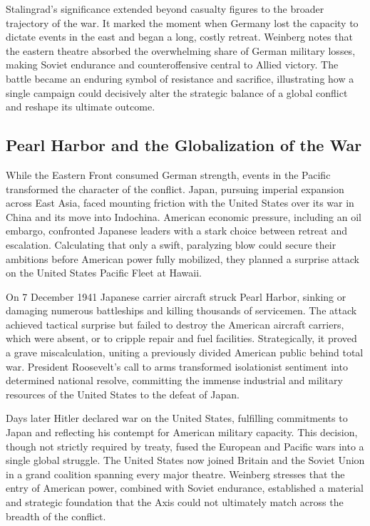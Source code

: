 Stalingrad's significance extended beyond casualty figures to the broader trajectory of the war. It marked the moment when Germany lost the capacity to dictate events in the east and began a long, costly retreat. Weinberg notes that the eastern theatre absorbed the overwhelming share of German military losses, making Soviet endurance and counteroffensive central to Allied victory. The battle became an enduring symbol of resistance and sacrifice, illustrating how a single campaign could decisively alter the strategic balance of a global conflict and reshape its ultimate outcome. \cite{beevor2012} \cite{weinberg1994} \cite{hastings2011}

\subsection{Pearl Harbor and the Globalization of the War}
While the Eastern Front consumed German strength, events in the Pacific transformed the character of the conflict. Japan, pursuing imperial expansion across East Asia, faced mounting friction with the United States over its war in China and its move into Indochina. American economic pressure, including an oil embargo, confronted Japanese leaders with a stark choice between retreat and escalation. Calculating that only a swift, paralyzing blow could secure their ambitions before American power fully mobilized, they planned a surprise attack on the United States Pacific Fleet at Hawaii.

On 7 December 1941 Japanese carrier aircraft struck Pearl Harbor, sinking or damaging numerous battleships and killing thousands of servicemen. The attack achieved tactical surprise but failed to destroy the American aircraft carriers, which were absent, or to cripple repair and fuel facilities. Strategically, it proved a grave miscalculation, uniting a previously divided American public behind total war. President Roosevelt's call to arms transformed isolationist sentiment into determined national resolve, committing the immense industrial and military resources of the United States to the defeat of Japan.

Days later Hitler declared war on the United States, fulfilling commitments to Japan and reflecting his contempt for American military capacity. This decision, though not strictly required by treaty, fused the European and Pacific wars into a single global struggle. The United States now joined Britain and the Soviet Union in a grand coalition spanning every major theatre. Weinberg stresses that the entry of American power, combined with Soviet endurance, established a material and strategic foundation that the Axis could not ultimately match across the breadth of the conflict.

